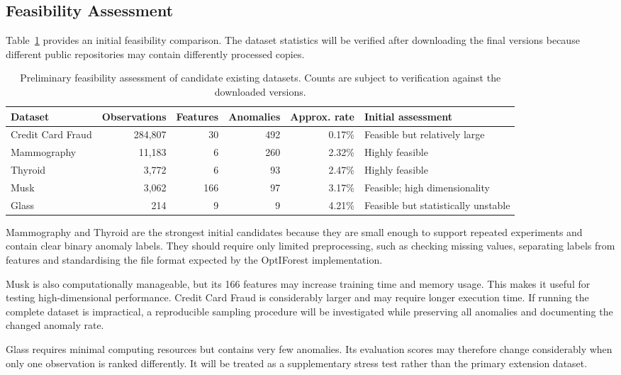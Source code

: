 \documentclass[11pt]{article}
\begin{document}
\subsection{Feasibility Assessment}
Table~\ref{tab:candidate-data} provides an initial feasibility comparison.
The dataset statistics will be verified after downloading the final
versions because different public repositories may contain differently
processed copies.

\begin{table}[t]
\centering
\small
\begin{tabular}{lrrrrl}
\toprule
Dataset & Observations & Features & Anomalies & Approx. rate & Initial assessment \\
\midrule
Credit Card Fraud & 284,807 & 30 & 492 & 0.17\% & Feasible but relatively large \\
Mammography & 11,183 & 6 & 260 & 2.32\% & Highly feasible \\
Thyroid & 3,772 & 6 & 93 & 2.47\% & Highly feasible \\
Musk & 3,062 & 166 & 97 & 3.17\% & Feasible; high dimensionality \\
Glass & 214 & 9 & 9 & 4.21\% & Feasible but statistically unstable \\
\bottomrule
\end{tabular}
\caption{Preliminary feasibility assessment of candidate existing
datasets. Counts are subject to verification against the downloaded
versions.}
\label{tab:candidate-data}
\end{table}

Mammography and Thyroid are the strongest initial candidates because
they are small enough to support repeated experiments and contain clear
binary anomaly labels. They should require only limited preprocessing,
such as checking missing values, separating labels from features and
standardising the file format expected by the OptIForest implementation.

Musk is also computationally manageable, but its 166 features may
increase training time and memory usage. This makes it useful for testing
high-dimensional performance. Credit Card Fraud is considerably larger
and may require longer execution time. If running the complete dataset is
impractical, a reproducible sampling procedure will be investigated while
preserving all anomalies and documenting the changed anomaly rate.

Glass requires minimal computing resources but contains very few
anomalies. Its evaluation scores may therefore change considerably when
only one observation is ranked differently. It will be treated as a
supplementary stress test rather than the primary extension dataset.
\end{document}
